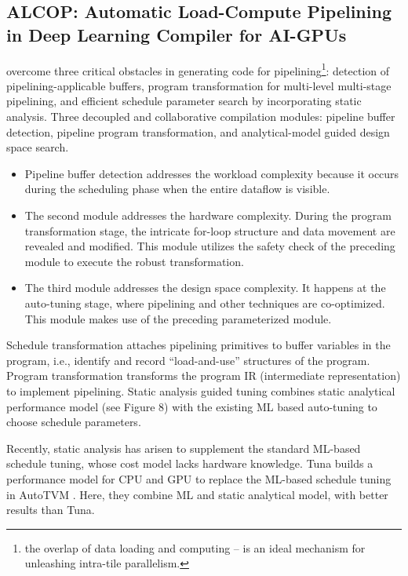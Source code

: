 \subsection{ALCOP: Automatic Load-Compute Pipelining in Deep Learning Compiler for AI-GPUs}
\cite{huang_alcop_2023} overcome three critical obstacles in generating code for pipelining\footnote{the overlap of data loading and computing – is an ideal mechanism for unleashing intra-tile parallelism.}: detection of pipelining-applicable buffers, program transformation for multi-level multi-stage pipelining, and efficient schedule parameter search by incorporating static analysis. Three decoupled and collaborative compilation modules: pipeline buffer detection, pipeline program transformation, and analytical-model guided design space search.
\begin{itemize}
    \item Pipeline buffer detection addresses the workload complexity because it occurs during the scheduling phase when the entire dataflow is visible.
    \item The second module addresses the hardware complexity. During the program transformation stage, the intricate for-loop structure and data movement are revealed and modified. This module utilizes the safety check of the preceding module to execute the robust transformation.
    \item The third module addresses the design space complexity. It happens at the auto-tuning stage, where pipelining and other techniques are co-optimized. This module makes use of the preceding parameterized module.
\end{itemize}

Schedule transformation attaches pipelining primitives to buffer variables in the program, i.e., identify and record ``load-and-use'' structures of the program. Program transformation transforms the program IR (intermediate representation) to implement pipelining. Static analysis guided tuning combines static analytical performance model (see Figure 8) with the existing ML based auto-tuning to choose schedule parameters.

Recently, static analysis has arisen to supplement the standard ML-based schedule tuning, whose cost model lacks hardware knowledge. Tuna \cite{Wang2021TunaAS} builds a performance model for CPU and GPU to replace the ML-based schedule tuning in AutoTVM \cite{Chen2018LearningTO}. Here, they combine ML and static analytical model, with better results than Tuna.

